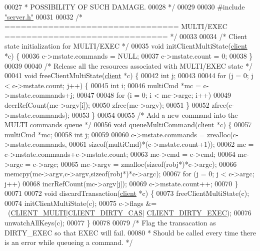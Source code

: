 \begin{DoxyCode}
00027 \textcolor{comment}{ * POSSIBILITY OF SUCH DAMAGE.}
00028 \textcolor{comment}{ */}
00029 
00030 \textcolor{preprocessor}{#}\textcolor{preprocessor}{include} \hyperlink{server_8h}{"server.h"}
00031 
00032 \textcolor{comment}{/* ================================ MULTI/EXEC ============================== */}
00033 
00034 \textcolor{comment}{/* Client state initialization for MULTI/EXEC */}
00035 \textcolor{keywordtype}{void} initClientMultiState(\hyperlink{structclient}{client} *c) \{
00036     c->mstate.commands = NULL;
00037     c->mstate.count = 0;
00038 \}
00039 
00040 \textcolor{comment}{/* Release all the resources associated with MULTI/EXEC state */}
00041 \textcolor{keywordtype}{void} freeClientMultiState(\hyperlink{structclient}{client} *c) \{
00042     \textcolor{keywordtype}{int} j;
00043 
00044     \textcolor{keywordflow}{for} (j = 0; j < c->mstate.count; j++) \{
00045         \textcolor{keywordtype}{int} i;
00046         multiCmd *mc = c->mstate.commands+j;
00047 
00048         \textcolor{keywordflow}{for} (i = 0; i < mc->argc; i++)
00049             decrRefCount(mc->argv[i]);
00050         zfree(mc->argv);
00051     \}
00052     zfree(c->mstate.commands);
00053 \}
00054 
00055 \textcolor{comment}{/* Add a new command into the MULTI commands queue */}
00056 \textcolor{keywordtype}{void} queueMultiCommand(\hyperlink{structclient}{client} *c) \{
00057     multiCmd *mc;
00058     \textcolor{keywordtype}{int} j;
00059 
00060     c->mstate.commands = zrealloc(c->mstate.commands,
00061             \textcolor{keyword}{sizeof}(multiCmd)*(c->mstate.count+1));
00062     mc = c->mstate.commands+c->mstate.count;
00063     mc->cmd = c->cmd;
00064     mc->argc = c->argc;
00065     mc->argv = zmalloc(\textcolor{keyword}{sizeof}(robj*)*c->argc);
00066     memcpy(mc->argv,c->argv,\textcolor{keyword}{sizeof}(robj*)*c->argc);
00067     \textcolor{keywordflow}{for} (j = 0; j < c->argc; j++)
00068         incrRefCount(mc->argv[j]);
00069     c->mstate.count++;
00070 \}
00071 
00072 \textcolor{keywordtype}{void} discardTransaction(\hyperlink{structclient}{client} *c) \{
00073     freeClientMultiState(c);
00074     initClientMultiState(c);
00075     c->flags &= ~(\hyperlink{server_8h_a7f61f783f429419f8c593291a509b03a}{CLIENT\_MULTI}|\hyperlink{server_8h_a0f4df645d72b6b3e9a0d07afbe502a51}{CLIENT\_DIRTY\_CAS}|
      \hyperlink{server_8h_a7c203dc3aba692e212393d08530bdb97}{CLIENT\_DIRTY\_EXEC});
00076     unwatchAllKeys(c);
00077 \}
00078 
00079 \textcolor{comment}{/* Flag the transacation as DIRTY\_EXEC so that EXEC will fail.}
00080 \textcolor{comment}{ * Should be called every time there is an error while queueing a command. */}

\end{DoxyCode}
